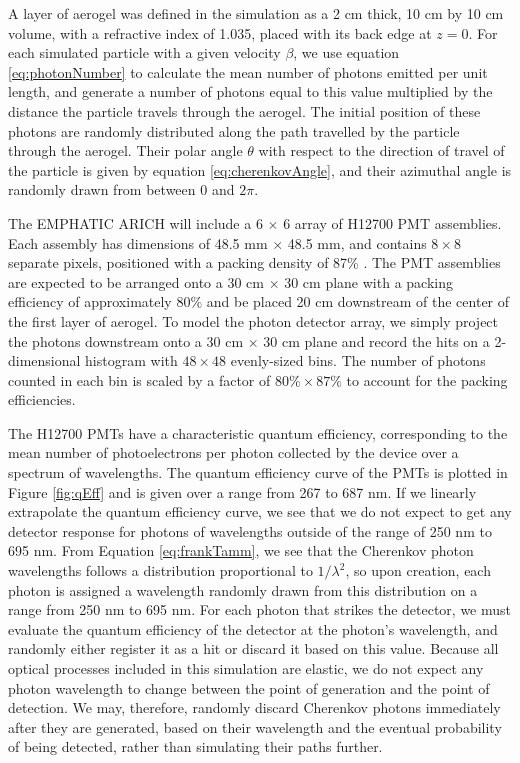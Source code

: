 A layer of aerogel was defined in the simulation as a 2 cm thick, 10 cm by 10 cm volume, with a refractive index of 1.035, placed with its back edge at $z=0$.
For each simulated particle with a given velocity $\beta$, we use equation \ref{eq:photonNumber} to calculate the mean number of photons emitted per unit length, and generate a number of photons equal to this value multiplied by the distance the particle travels through the aerogel.
The initial position of these photons are randomly distributed along the path travelled by the particle through the aerogel.
Their polar angle $\theta$ with respect to the direction of travel of the particle is given by equation \ref{eq:cherenkovAngle}, and their azimuthal angle is randomly drawn from between 0 and $2\pi$.

The EMPHATIC ARICH will include a 6 $\times$ 6 array of H12700 PMT assemblies. 
Each assembly has dimensions of 48.5 mm $\times$ 48.5 mm, and contains $8 \times 8$ separate pixels, positioned with a packing density of 87\% \cite{H12700}.
The PMT assemblies are expected to be arranged onto a 30 cm $\times$ 30 cm plane with a packing efficiency of approximately $80\%$ and be placed 20 cm downstream of the center of the first layer of aerogel.
To model the photon detector array, we simply project the photons downstream onto a 30 cm $\times$ 30 cm plane and record the hits on a 2-dimensional histogram with $48 \times 48$ evenly-sized bins.
The number of photons counted in each bin is scaled by a factor of $80\% \times 87\%$ to account for the packing efficiencies.

The H12700 PMTs have a characteristic quantum efficiency, corresponding to the mean number of photoelectrons per photon collected by the device over a spectrum of wavelengths.
The quantum efficiency curve of the PMTs is plotted in Figure \ref{fig:qEff} and is given over a range from 267 to 687 nm.
If we linearly extrapolate the quantum efficiency curve, we see that we do not expect to get any detector response for photons of wavelengths outside of the range of 250 nm to 695 nm.
From Equation \ref{eq:frankTamm}, we see that the Cherenkov photon wavelengths follows a distribution proportional to $1/\lambda^2$, so upon creation, each photon is assigned a wavelength randomly drawn from this distribution on a range from 250 nm to 695 nm.
For each photon that strikes the detector, we must evaluate the quantum efficiency of the detector at the photon's wavelength, and randomly either register it as a hit or discard it based on this value.
Because all optical processes included in this simulation are elastic, we do not expect any photon wavelength to change between the point of generation and the point of detection.
We may, therefore, randomly discard Cherenkov photons immediately after they are generated, based on their wavelength and the eventual probability of being detected, rather than simulating their paths further.

